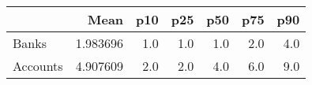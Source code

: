 \begin{tabular}{lrrrrrr}
\toprule
          &      Mean &  p10 &  p25 &  p50 &  p75 &  p90 \\
\midrule
    Banks &  1.983696 &  1.0 &  1.0 &  1.0 &  2.0 &  4.0 \\
 Accounts &  4.907609 &  2.0 &  2.0 &  4.0 &  6.0 &  9.0 \\
\bottomrule
\end{tabular}
